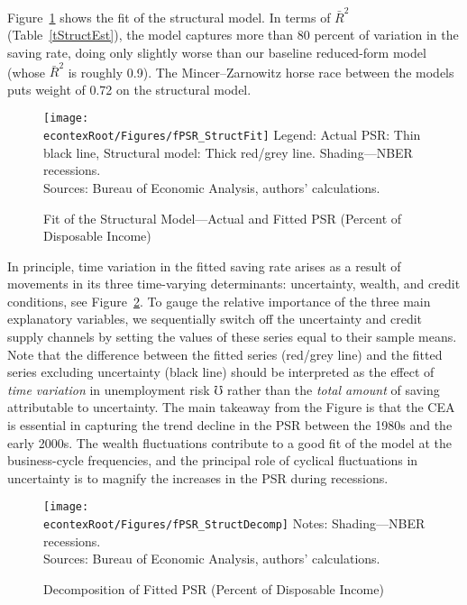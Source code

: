 \documentclass[titlepage]{\econtex}
\begin{document}
Figure~\ref{fPSR_StructFit} shows the fit of the structural model. In terms of $\bar{R}^2$ (Table~\ref{tStructEst}), the model captures more than 80 percent of variation in the saving rate, doing only slightly worse than our baseline reduced-form model (whose $\bar{R}^2$ is roughly 0.9). The Mincer--Zarnowitz horse race between the models puts weight of 0.72 on the structural model. %

\begin{figure}
\caption{Fit of the Structural Model---Actual and Fitted PSR (Percent of Disposable Income) \label{fPSR_StructFit}}
\texttt{[image: \\econtexRoot/Figures/fPSR\_StructFit]}
\footnotesize
Legend: Actual PSR: Thin black line, Structural model: Thick red/grey line. Shading---NBER recessions.\\[0mm]
\tiny Sources: Bureau of Economic Analysis, authors' calculations.
\end{figure}

In principle, time variation in the fitted saving rate arises as a result of movements in its three time-varying determinants: uncertainty, wealth, and credit conditions, see Figure~\ref{fPSR_StructDecomp}. To gauge the relative importance of the three main explanatory variables, we sequentially switch off the uncertainty and credit supply channels by setting the values of these series equal to their sample means. Note that the difference between the fitted series  (red/grey line) and the fitted series excluding uncertainty (black line) should be interpreted as the effect of \emph{time variation} in unemployment risk $\mho$ rather than the \emph{total amount} of saving attributable to uncertainty. The main takeaway from the Figure is that the CEA is essential in capturing the trend decline in the PSR between the 1980s and the early 2000s. The wealth fluctuations contribute to a good fit of the model at the business-cycle frequencies, and the principal role of cyclical fluctuations in uncertainty is to magnify the increases in the PSR during recessions.

\begin{figure}
\caption{Decomposition of Fitted PSR  (Percent of Disposable Income) \label{fPSR_StructDecomp}}
\texttt{[image: \\econtexRoot/Figures/fPSR\_StructDecomp]}
\footnotesize
Notes: Shading---NBER recessions.\\[0mm]
\tiny Sources: Bureau of Economic Analysis, authors' calculations.
\end{figure}
\end{document}
